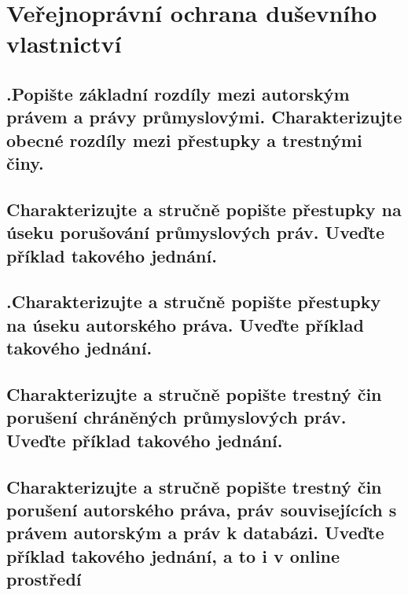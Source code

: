 \section{Veřejnoprávní ochrana duševního vlastnictví}

\subsection{.Popište základní rozdíly mezi autorským právem a právy průmyslovými. Charakterizujte obecné rozdíly mezi přestupky a trestnými činy.}


\subsection{Charakterizujte a stručně popište přestupky na úseku porušování průmyslových práv. Uveďte příklad takového jednání.}


\subsection{.Charakterizujte a stručně popište přestupky na úseku autorského práva. Uveďte příklad takového jednání.}


\subsection{Charakterizujte a stručně popište trestný čin porušení chráněných průmyslových práv. Uveďte příklad takového jednání.}


\subsection{Charakterizujte a stručně popište trestný čin porušení autorského práva, práv souvisejících s právem autorským a práv k databázi. Uveďte příklad takového jednání, a to i v online prostředí}